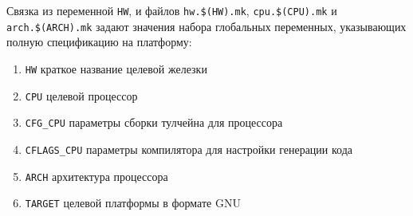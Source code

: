 Связка из переменной \verb|HW|, и файлов \verb|hw.$(HW).mk|, 
\verb|cpu.$(CPU).mk| и \verb|arch.$(ARCH).mk| задают значения набора глобальных
переменных, указывающих полную спецификацию на платформу:

\begin{enumerate}
  \item \verb|HW| краткое название целевой железки
  \item \verb|CPU| целевой процессор
  \item \verb|CFG_CPU| параметры сборки тулчейна для процессора
  \item \verb|CFLAGS_CPU| параметры компилятора для настройки генерации кода 
  \item \verb|ARCH| архитектура процессора


  \item \verb|TARGET|  целевой платформы в формате GNU
\end{enumerate}
